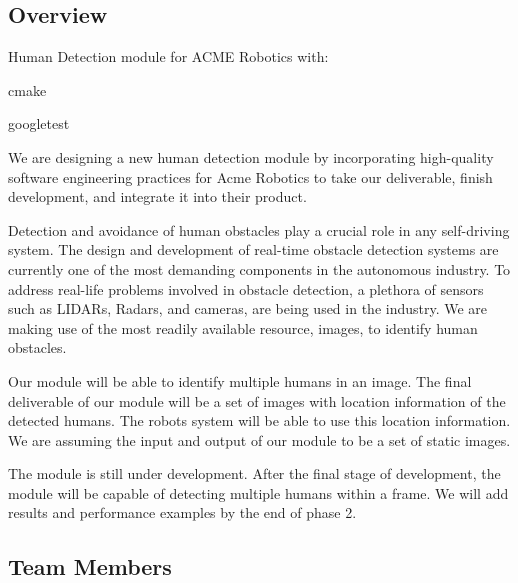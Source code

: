 \href{https://travis-ci.org/urastogi885/humanDetectionModule}{\tt } \subsection*{\href{https://coveralls.io/github/urastogi885/humanDetectionModule?branch=master}{\tt } }

\subsection*{Overview}

Human Detection module for A\+C\+ME Robotics with\+:


\begin{DoxyItemize}
\item cmake
\item googletest
\end{DoxyItemize}

We are designing a new human detection module by incorporating high-\/quality software engineering practices for Acme Robotics to take our deliverable, finish development, and integrate it into their product.

Detection and avoidance of human obstacles play a crucial role in any self-\/driving system. The design and development of real-\/time obstacle detection systems are currently one of the most demanding components in the autonomous industry. To address real-\/life problems involved in obstacle detection, a plethora of sensors such as L\+I\+D\+A\+Rs, Radars, and cameras, are being used in the industry. We are making use of the most readily available resource, images, to identify human obstacles.

Our module will be able to identify multiple humans in an image. The final deliverable of our module will be a set of images with location information of the detected humans. The robot\textquotesingle{}s system will be able to use this location information. We are assuming the input and output of our module to be a set of static images.

The module is still under development. After the final stage of development, the module will be capable of detecting multiple humans within a frame. We will add results and performance examples by the end of phase 2.

\subsection*{Team Members}

